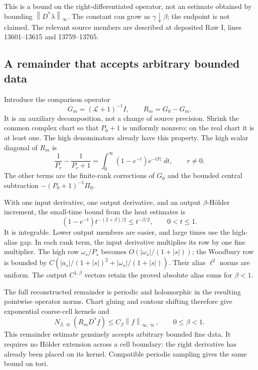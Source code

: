 \documentclass[11pt]{article}
\theoremstyle{remark}
\newcommand{\norm}[1]{\left\|#1\right\|}
\begin{document}
This is a bound on the right-differentiated operator, not an estimate
obtained by bounding $\norm{D^*\lambda}_\infty$. The constant can
grow as $\gamma\downarrow\beta$; the endpoint is not claimed.
The relevant source members are described at deposited Raw I,
lines 13601--13615 and 13759--13765.

\subsection{A remainder that accepts arbitrary bounded data}

Introduce the comparison operator
\begin{equation}\label{rd-massive-split}
 G_m=(\mathcal L+1)^{-1}I,\qquad R_m=G_0-G_m.
\end{equation}
It is an auxiliary decomposition, not a change of source precision.
Shrink the common complex chart so that $P_0+1$ is uniformly nonzero;
on the real chart it is at least one. The high denominators already
have this property. The high scalar diagonal of $R_m$ is
\begin{equation}\label{rd-high-remainder}
 \frac1{P_r}-\frac1{P_r+1}
    =\int_0^\infty(1-e^{-t})e^{-tP_r}\,dt,
                    \qquad r\ne0.
\end{equation}
The other terms are the finite-rank corrections of $G_0$ and the
bounded central subtraction $-(P_0+1)^{-1}\Pi_0$.

With one input derivative, one output derivative, and an output
$\beta$-H\"older increment, the small-time bound from the heat
estimates is
\[
 (1-e^{-t})t^{-(2+\beta)/2}\le t^{-\beta/2},
                       \qquad0<t\le1.
\]
It is integrable. Lower output members are easier, and large times
use the high-alias gap. In each rank term, the input derivative
multiplies its row by one fine multiplier. The high row
$\omega_s/P_s$ becomes $O(|\omega_s|/(1+|s|))$; the Woodbury row
is bounded by
$C(|a_s|/(1+|s|)^2+|\omega_s|/(1+|s|))$.
Their alias $\ell^2$ norms are uniform. The output
$C^{1,\beta}$ vectors retain the proved absolute alias sums for
$\beta<1$.

The full reconstructed remainder is periodic and holomorphic in
the resulting pointwise operator norms. Chart gluing and contour
shifting therefore give exponential coarse-cell kernels and
\begin{equation}\label{rd-remainder-bound}
 N_{\beta,\varpi}(R_mD^*f)
                  \le C_\beta\norm{f}_{\infty,\varpi},
                       \qquad0\le\beta<1.
\end{equation}
This remainder estimate genuinely accepts arbitrary bounded fine
data. It requires no H\"older extension across a cell boundary:
the right derivative has already been placed on its kernel.
Compatible periodic sampling gives the same bound on tori.
\end{document}
